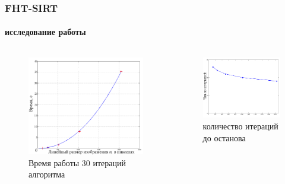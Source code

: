 \begin{frame}
\frametitle{FHT-SIRT}
\framesubtitle{исследование работы}

\begin{columns}[T,onlytextwidth]
  \hspace*{-0.5cm}
  \begin{column}{0.53\textwidth}
    \begin{figure}
      \centering
      \includegraphics[width=\textwidth]{../Dissertation/images/part1_img/time_30_it}
      \caption{Время работы 30 итераций алгоритма}
    \end{figure}
  \end{column}
  \begin{column}{0.6\textwidth}
    \begin{figure}
      \centering
      \includegraphics[width=\textwidth]{../Dissertation/images/part1_img/it_till_stop}
      \caption{количество итераций до останова}
    \end{figure}
  \end{column}
\end{columns}
\end{frame}

